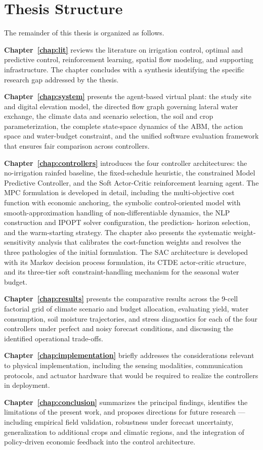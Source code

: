 \section{Thesis Structure}
\label{sec:intro-structure}

The remainder of this thesis is organized as follows.

\textbf{Chapter~\ref{chap:lit}} reviews the literature on irrigation
control, optimal and predictive control, reinforcement learning,
spatial flow modeling, and supporting infrastructure. The chapter
concludes with a synthesis identifying the specific research gap
addressed by the thesis.

\textbf{Chapter~\ref{chap:system}} presents the agent-based virtual
plant: the study site and digital elevation model, the directed
flow graph governing lateral water exchange, the climate data and
scenario selection, the soil and crop parameterization, the complete
state-space dynamics of the ABM, the action space and water-budget
constraint, and the unified software evaluation framework that
ensures fair comparison across controllers.

\textbf{Chapter~\ref{chap:controllers}} introduces the four controller
architectures: the no-irrigation rainfed baseline, the fixed-schedule
heuristic, the constrained Model Predictive Controller, and the Soft
Actor-Critic reinforcement learning agent. The MPC formulation is
developed in detail, including the multi-objective cost function with
economic anchoring, the symbolic control-oriented model with
smooth-approximation handling of non-differentiable dynamics, the
NLP construction and IPOPT solver configuration, the prediction-
horizon selection, and the warm-starting strategy. The chapter also
presents the systematic weight-sensitivity analysis that calibrates
the cost-function weights and resolves the three pathologies of the
initial formulation. The SAC architecture is developed with its
Markov decision process formulation, its CTDE actor-critic structure,
and its three-tier soft constraint-handling mechanism for the
seasonal water budget.

\textbf{Chapter~\ref{chap:results}} presents the comparative results
across the 9-cell factorial grid of climate scenario and budget
allocation, evaluating yield, water consumption, soil moisture
trajectories, and stress diagnostics for each of the four controllers
under perfect and noisy forecast conditions, and discussing the
identified operational trade-offs.

\textbf{Chapter~\ref{chap:implementation}} briefly addresses the
considerations relevant to physical implementation, including the
sensing modalities, communication protocols, and actuator hardware
that would be required to realize the controllers in deployment.

\textbf{Chapter~\ref{chap:conclusion}} summarizes the principal
findings, identifies the limitations of the present work, and
proposes directions for future research --- including empirical
field validation, robustness under forecast uncertainty,
generalization to additional crops and climatic regions, and the
integration of policy-driven economic feedback into the control
architecture.
